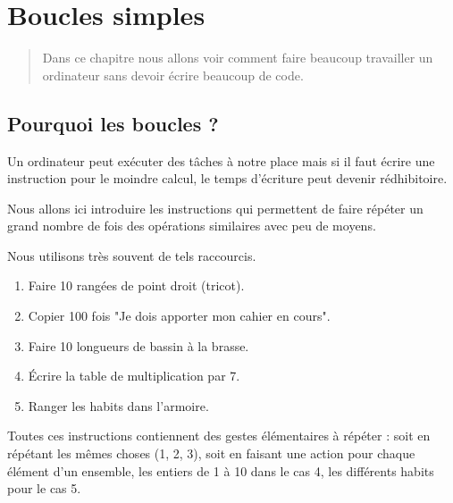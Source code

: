 \chapter{Boucles simples}
\thispagestyle{empty}
\begin{abstract}Dans ce chapitre nous allons voir comment faire beaucoup travailler un ordinateur sans devoir écrire beaucoup de code.
\end{abstract}
\section{Pourquoi les boucles ?}
Un ordinateur peut exécuter des tâches à notre place mais si il faut écrire une instruction pour le moindre calcul, le temps d'écriture peut devenir rédhibitoire. 

Nous allons ici introduire les instructions qui permettent de faire répéter un grand nombre de fois des opérations similaires avec peu de moyens.

Nous utilisons très souvent de tels raccourcis.
\begin{enumerate}
\item Faire 10 rangées de point droit (tricot).
\item Copier 100 fois "Je dois apporter mon cahier en cours".
\item Faire 10 longueurs de bassin à la brasse.
\item Écrire la table de multiplication par 7.
\item Ranger les habits dans l'armoire.
\end{enumerate}
Toutes ces instructions contiennent des gestes élémentaires à répéter : soit en répétant les mêmes choses (1, 2, 3), soit en faisant une action pour chaque élément d'un ensemble, les entiers de 1 à 10 dans le cas 4, les différents habits pour le cas 5.
